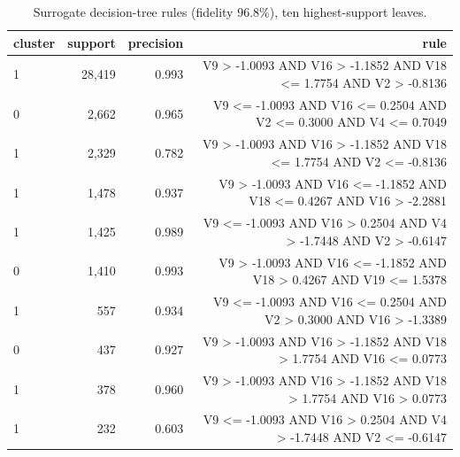 \begin{table}[htbp]
\centering
\begin{tabular}{lrrr}
\toprule
cluster & support & precision & rule \\
\midrule
1 & 28{,}419 & 0.993 & V9 >  -1.0093 AND V16 >  -1.1852 AND V18 <= 1.7754 AND V2 >  -0.8136 \\
0 & 2{,}662 & 0.965 & V9 <= -1.0093 AND V16 <= 0.2504 AND V2 <= 0.3000 AND V4 <= 0.7049 \\
1 & 2{,}329 & 0.782 & V9 >  -1.0093 AND V16 >  -1.1852 AND V18 <= 1.7754 AND V2 <= -0.8136 \\
1 & 1{,}478 & 0.937 & V9 >  -1.0093 AND V16 <= -1.1852 AND V18 <= 0.4267 AND V16 >  -2.2881 \\
1 & 1{,}425 & 0.989 & V9 <= -1.0093 AND V16 >  0.2504 AND V4 >  -1.7448 AND V2 >  -0.6147 \\
0 & 1{,}410 & 0.993 & V9 >  -1.0093 AND V16 <= -1.1852 AND V18 >  0.4267 AND V19 <= 1.5378 \\
1 & 557 & 0.934 & V9 <= -1.0093 AND V16 <= 0.2504 AND V2 >  0.3000 AND V16 >  -1.3389 \\
0 & 437 & 0.927 & V9 >  -1.0093 AND V16 >  -1.1852 AND V18 >  1.7754 AND V16 <= 0.0773 \\
1 & 378 & 0.960 & V9 >  -1.0093 AND V16 >  -1.1852 AND V18 >  1.7754 AND V16 >  0.0773 \\
1 & 232 & 0.603 & V9 <= -1.0093 AND V16 >  0.2504 AND V4 >  -1.7448 AND V2 <= -0.6147 \\
\bottomrule
\end{tabular}
\caption{Surrogate decision-tree rules (fidelity 96.8\%), ten highest-support leaves.}
\label{tab:rules}
\end{table}
